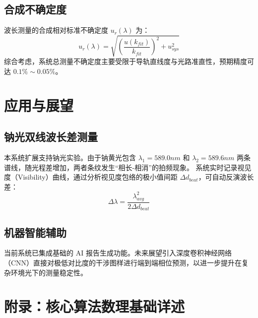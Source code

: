 \documentclass[twocolumn, a4paper, 10pt]{article}
\begin{document}
\subsection{合成不确定度}
波长测量的合成相对标准不确定度 $u_r(\lambda)$ 为：
\begin{equation}
    u_r(\lambda) = \sqrt{ \left( \frac{u(k_{fit})}{k_{fit}} \right)^2 + u_{sys}^2 }
\end{equation}
综合考虑，系统总测量不确定度主要受限于导轨直线度与光路准直性，预期精度可达 $0.1\% \sim 0.05\%$。

\section{应用与展望}
\subsection{钠光双线波长差测量}
本系统扩展支持钠光实验。由于钠黄光包含 $\lambda_1 = 589.0 nm$ 和 $\lambda_2 = 589.6 nm$ 两条谱线，随光程差增加，两者条纹发生“相长-相消”的拍频现象。
系统实时记录视见度（Visibility）曲线，通过分析视见度包络的极小值间距 $\Delta d_{beat}$，可自动反演波长差：
\begin{equation}
    \Delta \lambda = \frac{\lambda_{avg}^2}{2 \Delta d_{beat}}
\end{equation}

\subsection{机器智能辅助}
当前系统已集成基础的 AI 报告生成功能。未来展望引入深度卷积神经网络（CNN）直接对极低对比度的干涉图样进行端到端相位预测，以进一步提升在复杂环境光下的测量稳定性。

\appendix
\section{附录：核心算法数理基础详述}
\end{document}
